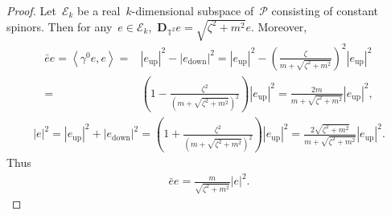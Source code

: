 \documentclass[10pt,a4paper]{amsart}
\newcommand{\T}{\mathbb{T}}
\newcommand{\pD}{\mathbf{D}}
\newcommand{\Abracket}[1]{\left<#1\right>} %
\newcommand{\parenthesis}[1]{\left(#1\right)} %
\DeclareMathOperator{\up}{up}
\DeclareMathOperator{\down}{down}
\begin{document}
\begin{proof}
Let~$\mathscr{E}_k$ be a real~$k$-dimensional subspace of~$\mathscr{P}$ consisting of constant spinors.
Then for any~$e\in\mathscr{E}_k$,~$\pD_{\T^2} e=\sqrt{\zeta^2+ m^2} e$.
Moreover,
\begin{align}
    \bar{e}e = \Abracket{\gamma^0 e, e}
    =& |e_{\up}|^2 - |e_{\down}|^2
    = |e_{\up}|^2 - \parenthesis{ \frac{\zeta}{m+\sqrt{\zeta^2+m^2}} }^2 |e_{\up}|^2 \\
    =&\parenthesis{  1 - \frac{\zeta^2}{(m+\sqrt{\zeta^2+m^2})^2} } |e_{\up}|^2
    = \frac{2 m}{m+\sqrt{\zeta^2+m^2}} |e_{\up}|^2,
\end{align}
\begin{align}
    |e|^2=|e_{\up}|^2 +|e_{\down}|^2
    =\parenthesis{  1 + \frac{\zeta^2}{(m+\sqrt{\zeta^2+m^2})^2} } |e_{\up}|^2
    =\frac{2\sqrt{\zeta^2+m^2}}{m+\sqrt{\zeta^2+m^2}}|e_{\up}|^2.
\end{align}
Thus
\begin{align}
    \bar{e}e = \frac{m}{\sqrt{\zeta^2 + m^2}} |e|^2.
\end{align}


\end{proof}
\end{document}
